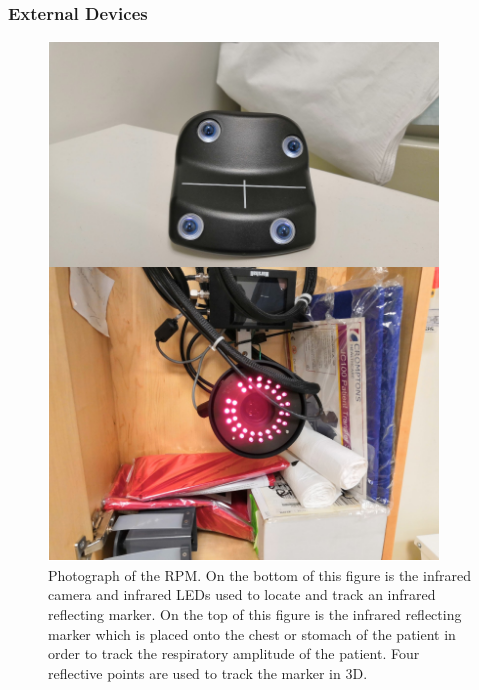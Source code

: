             \subsubsection{External Devices} \label{sec:external_devices}
                \begin{figure}
                    \centering
                        
                    \includegraphics[width=1.0\linewidth]{figures/background_rpm.png}
                        
                    \captionsetup{singlelinecheck=false}
                    \caption{
                        Photograph of the \gls{RPM}. On the bottom of this figure is the infrared camera and infrared \glspl{LED} used to locate and track an infrared reflecting marker. On the top of this figure is the infrared reflecting marker which is placed onto the chest or stomach of the patient in order to track the respiratory amplitude of the patient. Four reflective points are used to track the marker in \gls{3D}.
                    }
                    \label{fig:external_devices_rpm}
                \end{figure}
                
